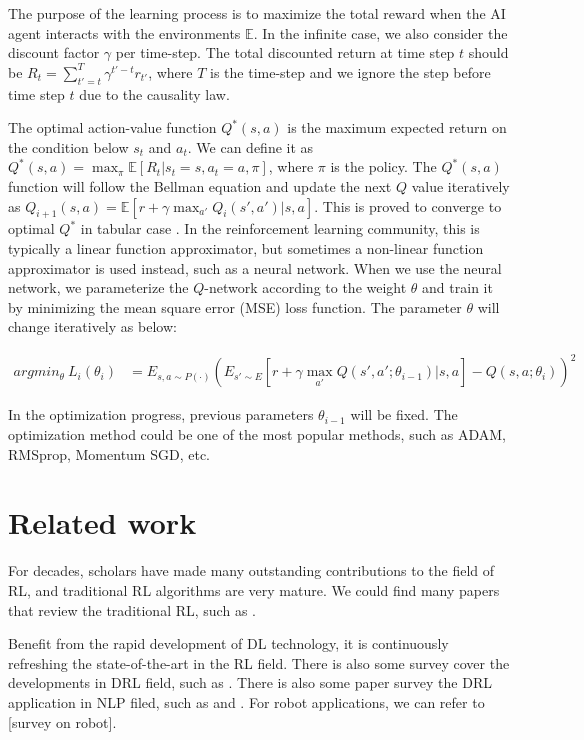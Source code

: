 \documentclass{article}
\begin{document}
The purpose of the learning process is to maximize the total reward when the AI agent interacts with the environments $\mathbb{E}$. In the infinite case, we also consider the discount factor $\gamma$ per time-step. The total discounted return  at time step $t$ should be  $R_t = \sum_{t'=t}^{T} \gamma^{t'-t} r_{t'}$, where $T$ is the time-step and we ignore the step before time step $t$ due to the causality law.

The optimal action-value function $Q^*(s,a)$  is  the maximum expected return on the condition below $s_t$ and $a_t$. We can define  it as $Q^*(s,a) = \max_{\pi} \mathbb{E}[{ R_t | s_t=s, a_t=a, \pi }]$, where $\pi$ is the policy. The $Q^*(s,a)$ function will follow the  Bellman equation and update the next $Q$ value iteratively as $Q_{i+1}(s,a) = \mathbb{E}\left[ r + \gamma \max_{a'} Q_i(s', a') | s, a \right]$. This is proved to converge to optimal $Q^ * $ in tabular case \citep{sutton2018reinforcement}. 
In the reinforcement learning community, this is typically a linear function approximator, but sometimes a non-linear function approximator is used instead, such as a neural network. When we use the neural network, we parameterize the $Q$-network according to the weight $\theta$ and train it by minimizing the mean square error (MSE) loss function. The parameter $\theta$ will change iteratively as below:

\begin{align}
	argmin _\theta  \ L_i\left(\theta_i\right) &={E}_{s,a \sim P(\cdot)}{\left({E}_{s' \sim {E}}[{r + \gamma \max_{a'} Q(s', a'; \theta_{i-1}) | s, a }] - Q \left(s,a ; \theta_i \right) \right)^2}
\end{align}


In the optimization progress, previous parameters  $\theta_{i-1}$ will be fixed.  The optimization method could be one of the most popular methods, such as ADAM, RMSprop, Momentum SGD, etc.
%

\section{Related work}
\label{sec:Related work}
For decades, scholars have made many outstanding contributions to the field of RL, and traditional RL algorithms are very mature.  We could find many papers that review the traditional RL, such as \citep{gosavi2009reinforcement, kaelbling1996reinforcement, sutton2018reinforcement, szepesvari2010algorithms}.

Benefit from the rapid development of DL technology, it is continuously refreshing the state-of-the-art in the RL field. There is also some survey cover the developments in DRL field, such as \citep{arulkumaran2017brief}. There is also some paper survey the DRL application in NLP filed, such as \citep{ranzato2015sequence} and \citep{bahdanau2016actor}. For robot applications, we can refer to [survey on robot].
\end{document}

